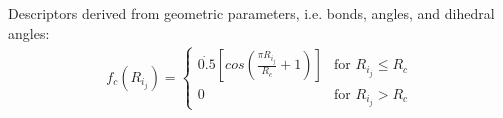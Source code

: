 Descriptors derived from geometric parameters, i.e. bonds, angles, and dihedral angles:
\begin{align*}
f_c(R_i_j) = 
\begin{cases}
\Dot{0.5}{[cos(\frac{{\pi}R_i_j}{R_c}+1)]}& \text{for } R_i_j {\leq} R_c \\
0& \text{for } R_i_j > R_c
\end{cases}
\end{align*}
